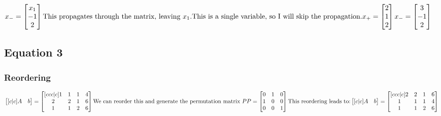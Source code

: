 \documentclass{article}
\begin{document}
\begin{math}
x_- = \begin{bmatrix}x_1\\-1\\2\end{bmatrix}\\
\text{This propagates through the matrix, leaving }x_1\text{.}\\
\text{This is a single variable, so I will skip the propagation.}\\
x_+ = \begin{bmatrix}2\\1\\2\end{bmatrix}\\
x_- = \begin{bmatrix}3\\-1\\2\end{bmatrix}\\
\end{math}

\subsection{Equation 3}

\subsubsection{Reordering}
\begin{math}
\begin{bmatrix}[c|c]A&b\end{bmatrix} = \begin{bmatrix}[ccc|c]1&1&1&4\\2&2&1&6\\1&1&2&6\end{bmatrix}\\\\
\text{We can reorder this and generate the permutation matrix }P\\
P = \begin{bmatrix}0&1&0\\1&0&0\\0&0&1\end{bmatrix}\\
\text{This reordering leads to:}\\
\begin{bmatrix}[c|c]A&b\end{bmatrix} = \begin{bmatrix}[ccc|c]2&2&1&6\\1&1&1&4\\1&1&2&6\end{bmatrix}\\\\
\end{math}
\end{document}
